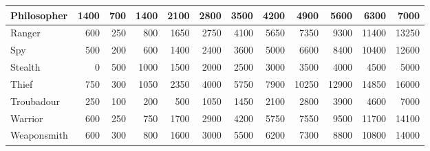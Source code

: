 {\begin{tabularx}{\linewidth}{Xrrrrrrrrrrr}
Philosopher &1400 & 700&1400 & 2100 & 2800 & 3500 & 4200 & 4900 & 5600 & 6300 & 7000 \\ \hline
Ranger & 600 & 250 & 800 & 1650 & 2750 & 4100 & 5650 & 7350 &9300 & 11400 & 13250 \\ \hline
Spy\footnotemark[5] & 500 & 200 & 600 &1400 & 2400 & 3600 & 5000 & 6600 & 8400 & 10400 & 12600 \\ \hline
Stealth & 0 & 500 &1000 & 1500 & 2000 & 2500 & 3000 & 3500 & 4000 & 4500 & 5000 \\ \hline
Thief\footnotemark[5] & 750 & 300 &1050 & 2350 & 4000 & 5750 & 7900 & 10250 & 12900 & 14850 & 16000 \\ \hline
Troubadour\footnotemark[6] & 250 & 100 & 200 & 500 & 1050 & 1450 & 2100 & 2800 & 3900 & 4600 & 7000 \\ \hline
Warrior & 600 & 250 & 750 & 1700 & 2900 & 4200 & 5750 & 7550 & 9500 & 11700 & 14100 \\ \hline
Weaponsmith & 600 & 300 & 800 & 1600 & 3000 & 5500 & 6200 & 7300 & 8800 & 10800 & 14000 \\ \hline
\end{tabularx}}

